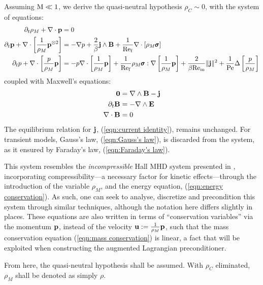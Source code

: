     Assuming $\mathrm{M}  \ll  1$, we derive the quasi-neutral hypothesis $\rho_{C}  \sim  0$, with the system of equations:
    {\small \begin{align}
        \partial_{t}\rho_{M} + \nabla\cdot\mathbf{p}  &=  0  \label{eqn:mass conservation} 
         \\
        \partial_{t}\mathbf{p} + \nabla\cdot\left[\frac{1}{\rho_{M}}\mathbf{p}^{\otimes 2}\right]  &=  - \nabla p + \frac{2}{\beta}\mathbf{j}\wedge\mathbf{B} + \frac{1}{\mathrm{Re}_{\mathrm{f}}}\nabla\cdot[\rho_{M}\pmb{\mathsf{\sigma}}]  \label{eqn:momentum conservation}  \\
        \partial_{t}p + \nabla\cdot\left[\frac{p}{\rho_{M}}\mathbf{p}\right]  &=  - p\nabla\cdot\left[\frac{1}{\rho_{M}}\mathbf{p}\right] + \frac{1}{\mathrm{Re}_{\mathrm{f}}}\rho_{M}\pmb{\mathsf{\sigma}}:\nabla\left[\frac{1}{\rho_{M}}\mathbf{p}\right] + \frac{2}{\beta\mathrm{Re}_{\mathrm{m}}}\|\mathbf{j}\|^{2} + \frac{1}{\mathrm{Pe}}\Delta\left[\frac{p}{\rho_{M}}\right]  \label{eqn:energy conservation}
    \end{align}}
    coupled with Maxwell's equations:
    \begin{align}
        \mathbf{0}  &=  \nabla\wedge\mathbf{B} - \mathbf{j}  \label{eqn:Ampère's law}  \\
        \partial_{t}\mathbf{B}  &=  - \nabla\wedge\mathbf{E}  \label{eqn:Faraday's law}  \\
        \nabla\cdot\mathbf{B}  &=  0  \label{eqn:Gauss's law}
    \end{align}
    The equilibrium relation for $\mathbf{j}$, (\ref{eqn:current identity}), remains unchanged. For transient models, Gauss's law, (\ref{eqn:Gauss's law}), is discarded from the system, as it ensured by Faraday's law, (\ref{eqn:Faraday's law}).

    This system resembles the \emph{incompressible} Hall MHD system presented in \cite{LHF22}, incorporating compressibility—a necessary factor for kinetic effects—through the introduction of the variable $\rho_{M}$, and the energy equation, (\ref{eqn:energy conservation}). As such, one can seek to analyse, discretize and precondition this system through similar techniques, although the notation here differs slightly in places. These equations are also written in terms of ``conservation variables'' via the momentum $\mathbf{p}$, instead of the velocity $\mathbf{u}  :=  \frac{1}{\rho_{M}}\mathbf{p}$, such that the mass conservation equation (\ref{eqn:mass conservation}) is linear, a fact that will be exploited when constructing the augmented Lagrangian preconditioner.

    From here, the quasi-neutral hypothesis shall be assumed. With $\rho_{C}$ eliminated, $\rho_{M}$ shall be denoted as simply $\rho$.
    
